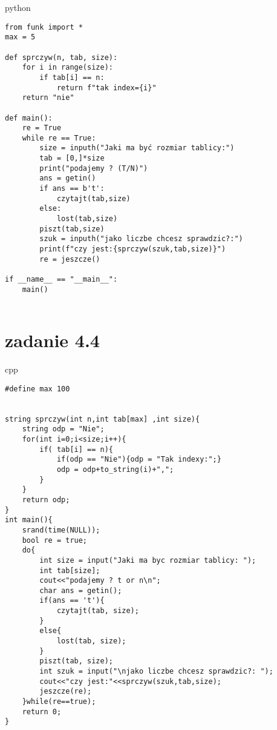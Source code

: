 \documentclass{article}
\begin{document}
\begin{temp}{\large python}  
\begin{verbatim}
from funk import *
max = 5

def sprczyw(n, tab, size):
    for i in range(size):
        if tab[i] == n:
            return f"tak index={i}"
    return "nie"

def main():
    re = True
    while re == True:
        size = inputh("Jaki ma być rozmiar tablicy:")
        tab = [0,]*size
        print("podajemy ? (T/N)")
        ans = getin()
        if ans == b't':
            czytajt(tab,size)
        else:
            lost(tab,size)
        piszt(tab,size)
        szuk = inputh("jako liczbe chcesz sprawdzic?:")
        print(f"czy jest:{sprczyw(szuk,tab,size)}")
        re = jeszcze()

if __name__ == "__main__":
    main()


\end{verbatim}
\end{temp}

\section*{zadanie 4.4}

\begin{temp}{\large cpp}  
\begin{verbatim}
#define max 100


string sprczyw(int n,int tab[max] ,int size){
    string odp = "Nie";
    for(int i=0;i<size;i++){
        if( tab[i] == n){
            if(odp == "Nie"){odp = "Tak indexy:";}
            odp = odp+to_string(i)+",";
        }
    }
    return odp;
}
int main(){
    srand(time(NULL));
    bool re = true;
    do{
        int size = input("Jaki ma byc rozmiar tablicy: ");        
        int tab[size];
        cout<<"podajemy ? t or n\n";
        char ans = getin();
        if(ans == 't'){
            czytajt(tab, size);
        }
        else{
            lost(tab, size);
        }
        piszt(tab, size);
        int szuk = input("\njako liczbe chcesz sprawdzic?: ");
        cout<<"czy jest:"<<sprczyw(szuk,tab,size);
        jeszcze(re);
    }while(re==true);
    return 0;
}

\end{verbatim}
\end{temp}
\end{document}
